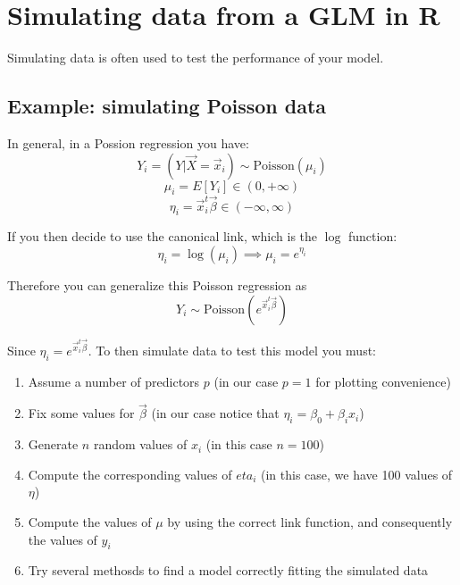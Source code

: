 \chapter{Simulating data from a GLM in R}
Simulating data is often used to test the performance of your model.

\section{Example: simulating Poisson data}
In general, in a Possion regression you have:
$$Y_i = (Y|\vec{X} = \vec{x}_i) \sim \text{Poisson}(\mu_i)$$
$$\mu_i = E[Y_i] \in (0, +\infty)$$
$$\eta_i = \vec{x}_i^t\vec{\beta} \in (-\infty, \infty)$$

If you then decide to use the canonical link, which is the $\log$ function:
$$\eta_i = \log(\mu_i) \implies \mu_i = e^{\eta_i}$$

Therefore you can generalize this Poisson regression as
$$Y_i \sim \text{Poisson}(e^{\vec{x}_i^t\vec{\beta}})$$

Since $\eta_i = e^{\vec{x}_i^t\vec{\beta}}$. To then simulate data to test this
model you must:
\begin{enumerate}
  \item Assume a number of predictors $p$ (in our case $p=1$ for plotting
  convenience)
  \item Fix some values for $\vec{\beta}$ (in our case notice that $\eta_i =
  \beta_0 + \beta_ix_i$)
  \item Generate $n$ random values of $x_i$ (in this case $n=100$) 
  \item Compute the corresponding values of $eta_i$ (in this case, we have 100
  values of $\eta$)
  \item Compute the values of $\mu$ by using the correct link function, and
  consequently the values of $y_i$
  \item Try several methosds to find a model correctly fitting the simulated
  data
\end{enumerate} \vspace{\baselineskip}

